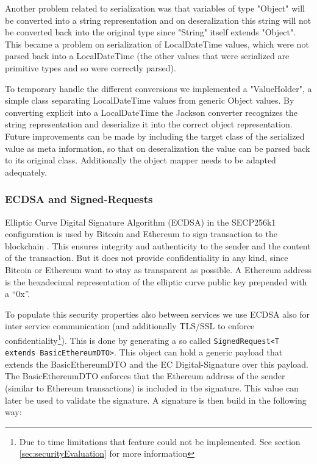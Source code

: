 Another problem related to serialization was that variables of type "Object" will be converted into a string representation and on deseralization this string will not be converted back into the original type since "String" itself extends "Object". This became a problem on serialization of LocalDateTime values, which were not parsed back into a LocalDateTime (the other values that were serialized are primitive types and so were correctly parsed). 

To temporary handle the different conversions we implemented a "ValueHolder", a simple class separating LocalDateTime values from generic Object values. By converting explicit into a LocalDateTime the Jackson converter recognizes the string representation and deserialize it into the correct object representation. Future improvements can be made by including the target class of the serialized value as meta information, so that on deseralization the value can be parsed back to its original class. Additionally the object mapper needs to be adapted adequately. 

\subsubsection{ECDSA and Signed-Requests}
\label{sec:ecdsa}

Elliptic Curve Digital Signature Algorithm (ECDSA) in the SECP256k1 configuration is used by Bitcoin and Ethereum to sign transaction to the blockchain \cite{mayer2016ecdsa}. This ensures integrity and authenticity to the sender and the content of the transaction. But it does not provide confidentiality in any kind, since Bitcoin or Ethereum want to stay as transparent as possible. 
A Ethereum address is the hexadecimal representation of the elliptic curve public key prepended with a “0x”.

To populate this security properties also between services we use ECDSA also for inter service communication (and additionally TLS/SSL to enforce confidentiality\footnote{Due to time limitations that feature could not be implemented. See section \ref{sec:securityEvaluation} for more information}). This is done by generating a so called \lstinline{SignedRequest<T extends BasicEthereumDTO>}. This object can hold a generic payload that extends the BasicEthereumDTO and the EC Digital-Signature over this payload. The BasicEthereumDTO enforces that the Ethereum address of the sender (similar to Ethereum transactions) is included in the signature. This value can later be used to validate the signature. A signature is then build in the following way:

